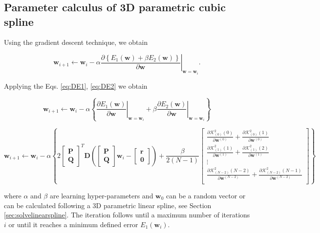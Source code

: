 \subsection{Parameter calculus of 3D parametric cubic spline}
\label{sec:solvecubicspline}
Using the gradient descent technique, we obtain

\begin{equation}
\mathbf{w}_{i+1}
\leftarrow 
\mathbf{w}_{i}
-
\alpha
\left.
\frac{\partial 
\left\{
E_{1}(\mathbf{w})+\beta E_{2}(\mathbf{w})
\right\}
}{\partial \mathbf{w}}
\right|_{\mathbf{w}=\mathbf{w}_{i}}.
\end{equation}

Applying the Eqs. \ref{eq:DE1}, \ref{eq:DE2} we obtain

\begin{equation}
\mathbf{w}_{i+1}
\leftarrow 
\mathbf{w}_{i}
-
\alpha
\left\{
\left.
\frac{\partial E_{1}(\mathbf{w})}{\partial \mathbf{w}}
\right|_{\mathbf{w}=\mathbf{w}_{i}}
+
\beta
\left.
\frac{\partial E_{2}(\mathbf{w})}{\partial \mathbf{w}}
\right|_{\mathbf{w}=\mathbf{w}_{i}}
\right\}
\end{equation}

\begin{equation}
\mathbf{w}_{i+1}
\leftarrow 
\mathbf{w}_{i}
-
\alpha
\left\{
2
\begin{bmatrix}
\mathbf{P}\\
\mathbf{Q}
\end{bmatrix}^{T}
\mathbf{D}
\left(
\begin{bmatrix}
\mathbf{P}\\
\mathbf{Q}
\end{bmatrix}
\mathbf{w}_{i}
-
\begin{bmatrix}
\mathbf{r}\\
\mathbf{0}
\end{bmatrix}
\right)
+
\frac{\beta}{2(N-1)}
\begin{bmatrix}
%
\frac{
\partial 
\mathcal{K}_{(0)}^{2}(0)
}{\partial \mathbf{w}^{(0)}}
+
\frac{
\partial 
\mathcal{K}_{(0)}^{2}(1)
}{\partial \mathbf{w}^{(0)}}\\[4pt]
%
\frac{
\partial 
\mathcal{K}_{(1)}^{2}(1)
}{\partial \mathbf{w}^{(1)}}
+
\frac{
\partial 
\mathcal{K}_{(1)}^{2}(2)
}{\partial \mathbf{w}^{(1)}}\\[4pt]
%
\vdots\\[4pt]
\frac{
\partial 
\mathcal{K}_{(N-2)}^{2}(N-2)
}{\partial \mathbf{w}^{(N-2)}}
+
\frac{
\partial 
\mathcal{K}_{(N-2)}^{2}(N-1)
}{\partial \mathbf{w}^{(N-2)}}\\
%
\end{bmatrix}
\right\}
\end{equation}

where $\alpha$ and $\beta$ are learning hyper-parameters and 
$\mathbf{w}_{0}$ can be a random vector or can
be calculated following a 3D parametric linear spline,
see Section \ref{sec:solvelinearspline}.
The iteration follows until a maximum number of iterations $i$ or until it reaches a
minimum defined error $E_1(\mathbf{w}_{i})$. 

